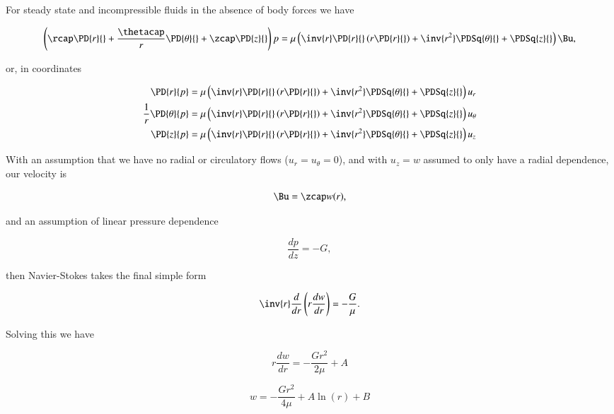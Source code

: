 For steady state and incompressible fluids in the absence of body forces we have

\begin{equation}\label{eqn:continuumL12:670}
\left(
\rcap \PD{r}{} +
\frac{\thetacap}{r} \PD{\theta}{} +
\zcap \PD{z}{}
\right)
p = \mu \left(
\inv{r} \PD{r}{} \left( r \PD{r}{} \right) + \inv{r^2} \PDSq{\theta}{} + \PDSq{z}{} \right)
\Bu,
\end{equation}

or, in coordinates

\begin{align}\label{eqn:continuumL12:690}
\PD{r}{p}
&= \mu \left(
\inv{r} \PD{r}{} \left( r \PD{r}{} \right) + \inv{r^2} \PDSq{\theta}{} + \PDSq{z}{} \right)
u_r \\
\frac{1}{r} \PD{\theta}{p}
&= \mu \left(
\inv{r} \PD{r}{} \left( r \PD{r}{} \right) + \inv{r^2} \PDSq{\theta}{} + \PDSq{z}{} \right)
u_\theta \\
\PD{z}{p}
&= \mu \left(
\inv{r} \PD{r}{} \left( r \PD{r}{} \right) + \inv{r^2} \PDSq{\theta}{} + \PDSq{z}{} \right)
u_z
\end{align}

With an assumption that we have no radial or circulatory flows ($u_r = u_\theta = 0$), and with $u_z = w$ assumed to only have a radial dependence, our velocity is

\begin{equation}\label{eqn:continuumL12:50}
\Bu = \zcap w(r),
\end{equation}

and an assumption of linear pressure dependence

\begin{equation}\label{eqn:continuumL12:60}
\frac{dp}{dz} = -G,
\end{equation}

then Navier-Stokes takes the final simple form

\begin{equation}\label{eqn:continuumL12:70}
\inv{r} \frac{d}{dr} \left( r \frac{dw}{dr} \right) = - \frac{G}{\mu}.
\end{equation}

Solving this we have

\begin{equation}\label{eqn:continuumL12:90}
r \frac{dw}{dr} = - \frac{G r^2}{2\mu} + A
\end{equation}

\begin{equation}\label{eqn:continuumL12:110}
w = -\frac{G r^2}{4 \mu} + A \ln(r) + B
\end{equation}

